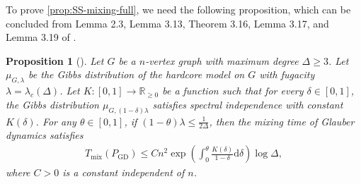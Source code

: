 \documentclass[11pt]{article}
\theoremstyle{plain}
\newtheorem{proposition}[theorem]{Proposition}
\theoremstyle{definition}
\theoremstyle{remark}
\newcommand{\R}{\mathbb{R}}
\newcommand{\tuple}[1]{\left(#1\right)}
\newcommand{\tp}{\tuple}
\def\-#1{\mathrm{#1}} %
\begin{document}
To prove \cref{prop:SS-mixing-full}, we need the following proposition, which can be concluded from Lemma 2.3, Lemma 3.13, Theorem 3.16, Lemma 3.17, and Lemma 3.19 of \cite{CCYZ24}.
\begin{proposition}[\cite{CCYZ24,chen2022localization}]\label{prop:SI-to-AT}
	Let $G$ be a $n$-vertex graph with maximum degree $\Delta\geq3$.
	Let $\mu_{G,\lambda}$ be the Gibbs distribution of the hardcore model on $G$ with fugacity $\lambda=\lambda_c(\Delta)$.
	Let $K:[0,1]\to \R_{\ge 0}$ be a function such that for every $\delta \in [0,1]$, the Gibbs distribution $\mu_{G,(1-\delta)\lambda}$
	satisfies spectral independence with constant $K(\delta)$.
	For any $\theta\in[0,1]$, if $(1-\theta)\lambda\leq\frac{1}{2\Delta}$, then the mixing time of Glauber dynamics satisfies
	\begin{align*}
		T_{\mathrm{mix}}(P_{\mathrm{GD}}) \leq 
		Cn^2\exp\tp{\int_0^{\theta}\frac{K(\delta)}{1-\delta}\-d\delta}\log\Delta,
	\end{align*}
	where $C>0$ is a constant independent of $n$. 
\end{proposition}
\end{document}
